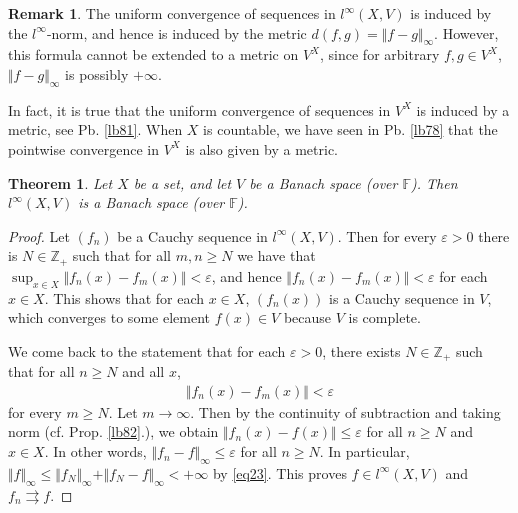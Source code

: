 \documentclass[12pt,b5paper,notitlepage]{article}
\theoremstyle{definition}
\newtheorem{rem}[df]{Remark}
\theoremstyle{plain}
\newtheorem{thm}[df]{Theorem}
\newcommand{\Zbb}{\mathbb Z}
\newcommand{\Fbb}{\mathbb F}
\newcommand{\eps}{\varepsilon}
\numberwithin{equation}{section}
\begin{document}
\begin{rem}
The uniform convergence of sequences in $l^\infty(X,V)$ is induced by the $l^\infty$-norm, and hence is induced by the metric $d(f,g)=\Vert f-g\Vert_\infty$. However, this formula cannot be extended to a metric on $V^X$, since for arbitrary $f,g\in V^X$, $\Vert f-g\Vert_\infty$ is possibly $+\infty$. 



In fact, it is true that the uniform convergence of sequences in $V^X$ is induced by a metric, see Pb. \ref{lb81}. When $X$ is countable, we have seen in Pb. \ref{lb78} that the pointwise convergence in $V^X$ is also given by a metric. \hfill\qedsymbol
\end{rem}












\begin{thm}\label{lb85}
Let $X$ be a set, and let $V$ be a Banach space (over $\Fbb$). Then $l^\infty(X,V)$ is a Banach space (over $\Fbb$).
\end{thm}


\begin{proof}
Let $(f_n)$ be a Cauchy sequence in $l^\infty(X,V)$. Then for every $\eps>0$ there is $N\in\Zbb_+$ such that for all $m,n\geq N$ we have that $\sup_{x\in X}\Vert f_n(x)-f_m(x)\Vert <\eps$, and hence $\Vert f_n(x)-f_m(x)\Vert <\eps$ for each $x\in X$. This shows that for each $x\in X$, $(f_n(x))$ is a Cauchy sequence in $V$, which converges to some element $f(x)\in V$ because $V$ is complete.

We come back to the statement that for each $\eps>0$, there exists $N\in\Zbb_+$ such that for all $n\geq N$ and all $x$,
\begin{align*}
\Vert f_n(x)-f_m(x)\Vert <\eps  
\end{align*}
for every $m\geq N$. Let $m\rightarrow\infty$. Then by the continuity of subtraction and taking norm (cf. Prop. \ref{lb82}.), we obtain $\Vert f_n(x)-f(x)\Vert\leq \eps$ for all $n\geq N$ and $x\in X$. In other words, $\Vert f_n-f\Vert_\infty\leq\eps$ for all $n\geq N$. In particular, $\Vert f\Vert_\infty\leq\Vert f_N\Vert_\infty +\Vert f_N-f\Vert_\infty<+\infty$ by \eqref{eq23}. This proves $f\in l^\infty(X,V)$ and $f_n\rightrightarrows f$.
\end{proof}
\end{document}
